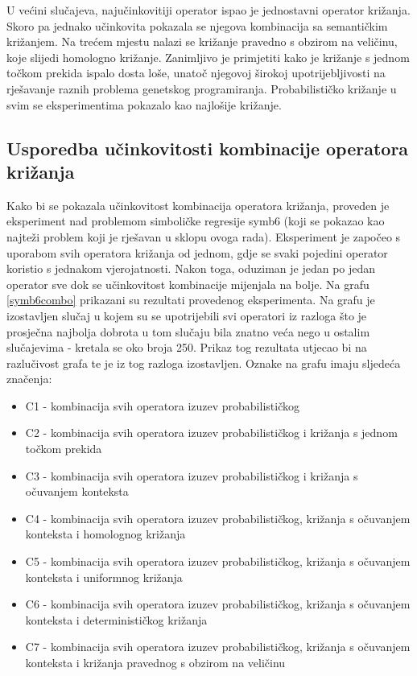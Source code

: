 U većini slučajeva, najučinkovitiji operator ispao je jednostavni operator križanja. Skoro pa jednako učinkovita pokazala se njegova kombinacija sa semantičkim križanjem. Na trećem mjestu nalazi se križanje pravedno s obzirom na veličinu, koje slijedi homologno križanje. Zanimljivo je primjetiti kako je križanje s jednom točkom prekida ispalo dosta loše, unatoč njegovoj širokoj upotrijebljivosti na rješavanje raznih problema genetskog programiranja. Probabilističko križanje u svim se eksperimentima pokazalo kao najlošije križanje.

\subsection{Usporedba učinkovitosti kombinacije operatora križanja}

Kako bi se pokazala učinkovitost kombinacija operatora križanja, proveden je eksperiment nad problemom simboličke regresije symb6 (koji se pokazao kao najteži problem koji je rješavan u sklopu ovoga rada). Eksperiment je započeo s uporabom svih operatora križanja od jednom, gdje se svaki pojedini operator koristio s jednakom vjerojatnosti. Nakon toga, oduziman je jedan po jedan operator sve dok se učinkovitost kombinacije mijenjala na bolje. Na grafu \ref{symb6combo} prikazani su rezultati provedenog eksperimenta. Na grafu je izostavljen slučaj u kojem su se upotrijebili svi operatori iz razloga što je prosječna najbolja dobrota u tom slučaju bila znatno veća nego u ostalim slučajevima - kretala se oko broja 250. Prikaz tog rezultata utjecao bi na razlučivost grafa te je iz tog razloga izostavljen. Oznake na grafu imaju sljedeća značenja:

\begin{itemize}
\item{C1 - kombinacija svih operatora izuzev probabilističkog}
\item{C2 - kombinacija svih operatora izuzev probabilističkog i križanja s jednom točkom prekida}
\item{C3 - kombinacija svih operatora izuzev probabilističkog i križanja s očuvanjem konteksta}
\item{C4 - kombinacija svih operatora izuzev probabilističkog, križanja s očuvanjem konteksta i homolognog križanja}
\item{C5 - kombinacija svih operatora izuzev probabilističkog, križanja s očuvanjem konteksta i uniformnog križanja}
\item{C6 - kombinacija svih operatora izuzev probabilističkog, križanja s očuvanjem konteksta i determinističkog križanja}
\item{C7 - kombinacija svih operatora izuzev probabilističkog, križanja s očuvanjem konteksta i križanja pravednog s obzirom na veličinu}

\end{itemize}


